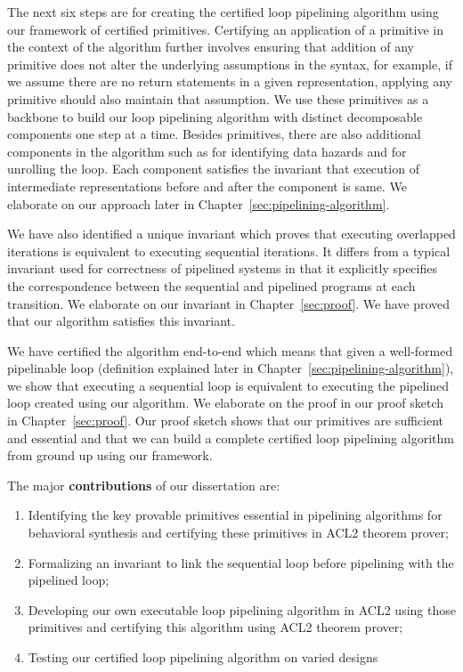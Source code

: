 The next six steps are for creating the certified loop pipelining algorithm using our framework of certified primitives. Certifying an application of a primitive in the context of the algorithm further involves ensuring that addition of any primitive does not alter the underlying assumptions in the syntax, for example, if we assume there are no return statements in a given representation, applying any primitive should also maintain that assumption. We use these primitives as a backbone to build our loop pipelining algorithm with distinct decomposable components one step at a time. Besides primitives, there are also additional components in the algorithm such as for identifying data hazards and for unrolling the loop. Each component satisfies the invariant that execution of intermediate representations before and after the component is same.  We elaborate on our approach later in Chapter~\ref{sec:pipelining-algorithm}.

We have also identified a unique invariant which proves that executing overlapped iterations is equivalent to executing sequential iterations. It differs from a typical invariant used for correctness of pipelined systems in that it explicitly specifies the correspondence between the sequential and pipelined programs at each transition.  We elaborate on our invariant in Chapter~\ref{sec:proof}. We have proved that our algorithm satisfies this invariant.

We have certified the algorithm end-to-end which means that given a well-formed pipelinable loop (definition explained later in Chapter~\ref{sec:pipelining-algorithm}), we show that executing a sequential loop is equivalent to executing the pipelined loop created using our algorithm. We elaborate on the proof in our proof sketch in Chapter~\ref{sec:proof}. Our proof sketch shows that our primitives are sufficient and essential and that we can build a complete certified loop pipelining algorithm from ground up using our framework.

The major \textbf{contributions} of our dissertation are:
\begin{enumerate}[--]
\item Identifying the key provable primitives essential in pipelining algorithms for behavioral synthesis and certifying these primitives in ACL2 theorem prover;
\item Formalizing an invariant to link the sequential loop before pipelining with the pipelined loop;
\item Developing our own executable loop pipelining algorithm in ACL2 using those primitives and certifying this algorithm using ACL2 theorem prover;
\item Testing our certified loop pipelining algorithm on varied designs
\end{enumerate}

